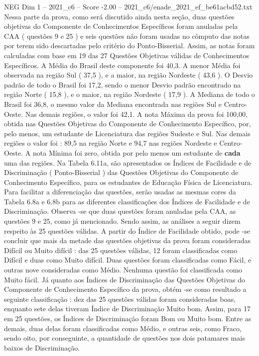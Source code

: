\begin{textsample}{NEG Dim 1 – 2021\_c6 – Score -2.00 – 2021\_c6/enade\_2021\_ef\_be61acbd52.txt}
Nessa parte da prova, como será discutido ainda nesta seção, duas questões objetivas do Componente de Conhecimentos Específicos foram anuladas pela CAA ( questões 9 e 25 ) e seis questões não foram usadas no cômputo das notas por terem sido descartadas pelo critério do Ponto-Bisserial.
Assim, as notas foram calculadas com base em 19 das 27 Questões Objetivas válidas de Conhecimentos Específicos.
A Média do Brasil deste componente foi 40,3.
A menor Média foi observada na região Sul ( 37,5 ), e a maior, na região Nordeste ( 43,6 ).
O Desvio padrão de todo o Brasil foi 17,2, sendo o menor Desvio padrão encontrado na região Norte ( 15,8 ), e o maior, na região Nordeste ( 17,9 ).
A Mediana de todo o Brasil foi 36,8, o mesmo valor da Mediana encontrada nas regiões Sul e Centro-Oeste.
Nas demais regiões, o valor foi 42,1.
A nota Máxima da prova foi 100,00, obtida nas Questões Objetivas do Componente de Conhecimento Específico, por, pelo menos, um estudante de Licenciatura das regiões Sudeste e Sul.
Nas demais regiões o valor foi : 89,5 na região Norte e 94,7 nas regiões Nordeste e Centro-Oeste.
A nota Mínima foi zero, obtida por pelo menos um estudante de \textbf{cada} uma das regiões.
Na Tabela 6.11a, são apresentados os Índices de Facilidade e de Discriminação ( Ponto-Bisserial ) das Questões Objetivas do Componente de Conhecimento Específico, para os estudantes de Educação Física de Licenciatura.
Para facilitar a diferenciação das questões, serão usadas as mesmas cores da Tabela 6.8a e 6.8b para as diferentes classificações dos Índices de Facilidade e de Discriminação.
Observa -se que duas questões foram anuladas pela CAA, as questões 9 e 25, como já mencionado.
Sendo assim, as análises a seguir dizem respeito às 25 questões válidas.
A partir do Índice de Facilidade obtido, pode -se concluir que mais da metade das questões objetivas da prova foram consideradas Difícil ou Muito difícil : das 25 questões válidas, 12 foram classificadas como Difícil e duas como Muito difícil.
Duas questões foram classificadas como Fácil, e outras nove consideradas como Médio.
Nenhuma questão foi classificada como Muito fácil.
Já quanto aos Índices de Discriminação das Questões Objetivas do Componente de Conhecimento Específico da prova, obtém -se como resultado a seguinte classificação : dez das 25 questões válidas foram consideradas boas, enquanto sete delas tiveram Índice de Discriminação Muito bom.
Assim, para 17 em 25 questões, os Índices de Discriminação foram Bom ou Muito bom.
Entre as demais, duas delas foram classificadas como Médio, e outras seis, como Fraco, sendo oito, por conseguinte, a quantidade de questões nos dois patamares mais baixos de Discriminação.

\end{textsample}
